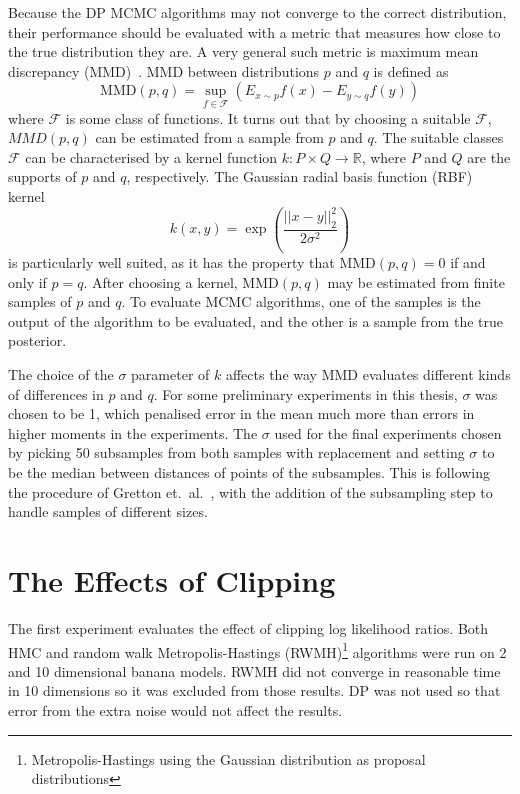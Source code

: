 \documentclass[english,twoside,openright]{HYgraduMLDS}
\newcommand{\R}{\mathbb{R}}
\begin{document}
Because the DP MCMC algorithms may not converge to the correct distribution, 
their performance should be evaluated with a metric that measures how close 
to the true distribution they are. A very general such metric is maximum mean
discrepancy (MMD)~\cite{GrettonBRSS12}. MMD between distributions \(p\) and \(q\) 
is defined as 
\[
    \mathrm{MMD}(p, q) = \sup_{f\in \mathcal{F}}(E_{x\sim p}f(x) - E_{y\sim q}f(y))
\]
where \(\mathcal{F}\) is some class of functions. It turns out that by 
choosing a suitable \(\mathcal{F}\), \(MMD(p, q)\) can be estimated from a 
sample from \(p\) and \(q\). The suitable classes \(\mathcal{F}\) can be 
characterised by a kernel function \(k\colon P\times Q \to \R\), where 
\(P\) and \(Q\) are the supports of \(p\) and \(q\), respectively.
The Gaussian radial basis function (RBF) kernel 
\[
    k(x, y) = \exp\left(\frac{||x - y||_2^2}{2\sigma^2}\right)
\]
is particularly well suited, as it has the property that 
\(\mathrm{MMD}(p, q) = 0\) if and only if \(p = q\). After choosing a kernel,
\(\mathrm{MMD}(p, q)\) may be estimated from finite samples of \(p\) and \(q\).
To evaluate MCMC algorithms, one of the samples is the output of the algorithm 
to be evaluated, and the other is a sample from the true posterior.

The choice of the \(\sigma\) parameter of \(k\) affects the way MMD evaluates 
different kinds of differences in \(p\) and \(q\). For some preliminary experiments
in this thesis, \(\sigma\) was chosen to be 1, which penalised error in the 
mean much more than errors in higher moments in the experiments. 
The \(\sigma\) used for the final experiments chosen by picking 50 subsamples 
from both samples with replacement and setting \(\sigma\) to be the median 
between distances of points of the subsamples. This is following the procedure of 
Gretton et.\ al.~\cite{GrettonBRSS12}, with the addition of the subsampling step 
to handle samples of different sizes.

\section{The Effects of Clipping}

The first experiment evaluates the effect of clipping log likelihood ratios.
Both HMC and random walk Metropolis-Hastings (RWMH)\footnote{Metropolis-Hastings using the Gaussian
distribution as proposal distributions} 
algorithms were run on 2 and 10 dimensional banana models. RWMH did not 
converge in reasonable time in 10 dimensions so it was excluded from those results.
DP was not used so that error from the extra noise would not affect the results.
\end{document}
